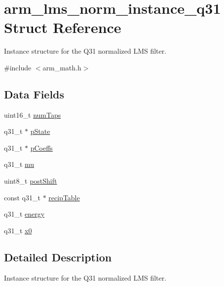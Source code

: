 \hypertarget{structarm__lms__norm__instance__q31}{}\section{arm\+\_\+lms\+\_\+norm\+\_\+instance\+\_\+q31 Struct Reference}
\label{structarm__lms__norm__instance__q31}


Instance structure for the Q31 normalized L\+MS filter.  




{\ttfamily \#include $<$arm\+\_\+math.\+h$>$}

\subsection*{Data Fields}
\begin{DoxyCompactItemize}
\item 
uint16\+\_\+t \mbox{\hyperlink{structarm__lms__norm__instance__q31_a751941891e47f522a7f5375fe8990aac}{num\+Taps}}
\item 
q31\+\_\+t $\ast$ \mbox{\hyperlink{structarm__lms__norm__instance__q31_adee4ba3ee8869865af7d8fa08ca913d6}{p\+State}}
\item 
q31\+\_\+t $\ast$ \mbox{\hyperlink{structarm__lms__norm__instance__q31_a68888e36167d81cb7836db10367a1682}{p\+Coeffs}}
\item 
q31\+\_\+t \mbox{\hyperlink{structarm__lms__norm__instance__q31_a21ab4237a726ea7751f5026d89d2e577}{mu}}
\item 
uint8\+\_\+t \mbox{\hyperlink{structarm__lms__norm__instance__q31_a74050e9f36542bd56f4052381a82ae8f}{post\+Shift}}
\item 
const q31\+\_\+t $\ast$ \mbox{\hyperlink{structarm__lms__norm__instance__q31_ac2e860f11b18d416a6b9aeb4660694dc}{recip\+Table}}
\item 
q31\+\_\+t \mbox{\hyperlink{structarm__lms__norm__instance__q31_a012fee0f71095d2557bb633e73ef7355}{energy}}
\item 
q31\+\_\+t \mbox{\hyperlink{structarm__lms__norm__instance__q31_a973b8350a0c7b113a5f002bc0b86bf76}{x0}}
\end{DoxyCompactItemize}


\subsection{Detailed Description}
Instance structure for the Q31 normalized L\+MS filter. 

